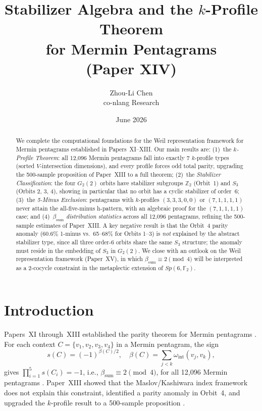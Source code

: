 \documentclass[11pt,a4paper]{article}
\title{Stabilizer Algebra and the $k$-Profile Theorem\\
       for Mermin Pentagrams\\
       {\large (Paper XIV)}}
\author{Zhou-Li Chen \\ co-nlang Research}
\date{June 2026}
\theoremstyle{remark}
\begin{document}
\maketitle

\begin{abstract}
We complete the computational foundations for the Weil representation framework
for Mermin pentagrams established in Papers~XI--XIII.
Our main results are:
(1)~the \emph{$k$-Profile Theorem}: all 12{,}096 Mermin pentagrams fall into
exactly 7 $k$-profile types (sorted $V$-intersection dimensions), and every
profile forces odd total parity, upgrading the 500-sample proposition of
Paper~XIII to a full theorem;
(2)~the \emph{Stabilizer Classification}: the four $G_2(2)$ orbits have
stabilizer subgroups $\mathbb{Z}_2$ (Orbit~1) and $S_3$ (Orbits 2, 3, 4),
showing in particular that no orbit has a cyclic stabilizer of order~6;
(3)~the \emph{5-Minus Exclusion}: pentagrams with $k$-profiles $(3,3,3,0,0)$
or $(7,1,1,1,1)$ never attain the all-five-minus h-pattern, with an algebraic
proof for the $(7,1,1,1,1)$ case;
and (4)~\emph{$\beta_{\mathrm{sum}}$ distribution statistics} across all
12{,}096 pentagrams, refining the 500-sample estimates of Paper~XIII.
A key negative result is that the Orbit~4 parity anomaly
(60.6\% 1-minus vs.\ 65--68\% for Orbits 1--3) is \emph{not} explained by
the abstract stabilizer type, since all three order-6 orbits share the same
$S_3$ structure; the anomaly must reside in the embedding of $S_3$ in $G_2(2)$.
We close with an outlook on the Weil representation framework (Paper~XV),
in which $\beta_{\mathrm{sum}} \equiv 2 \pmod{4}$ will be interpreted as a
2-cocycle constraint in the metaplectic extension of $Sp(6,\mathbb{F}_2)$.
\end{abstract}


\section{Introduction}

Papers~XI through~XIII established the parity theorem for Mermin pentagrams
\cite{PaperXI,PaperXII,PaperXIII}.
For each context $C = \{v_1,v_2,v_3,v_4\}$ in a Mermin pentagram, the sign
\[
  s(C) = (-1)^{\beta(C)/2}, \quad
  \beta(C) = \sum_{j<k} \omega_{\mathrm{int}}(v_j, v_k),
\]
gives $\prod_{i=1}^5 s(C_i) = -1$, i.e., $\beta_{\mathrm{sum}} \equiv 2\pmod 4$,
for all 12{,}096 Mermin pentagrams \cite{PaperXI}.
Paper~XIII showed that the Maslov/Kashiwara index framework does not explain
this constraint, identified a parity anomaly in Orbit~4, and upgraded the
$k$-profile result to a 500-sample proposition \cite{PaperXIII}.
\end{document}

